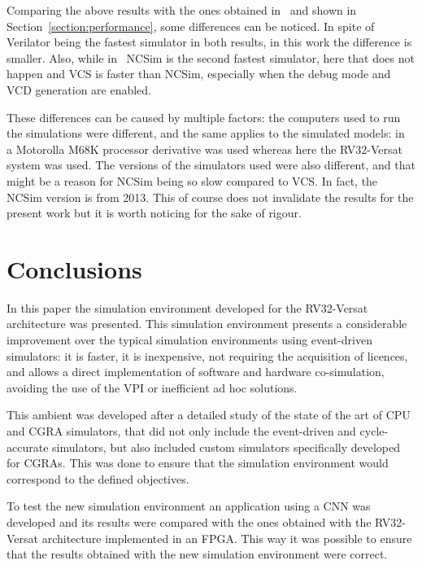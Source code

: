 \documentclass[conference]{IEEEtran}
\begin{document}
Comparing the above results with the ones obtained
in~\cite{verilator:benchmarks} and shown in Section~\ref{section:performance},
some differences can be noticed. In spite of Verilator being the fastest
simulator in both results, in this work the difference is smaller. Also, while
in~\cite{verilator:benchmarks} NCSim is the second fastest simulator, here that
does not happen and VCS is faster than NCSim, especially when the debug mode and
\ac{VCD} generation are enabled.

These differences can be caused by multiple factors: the computers used to run
the simulations were different, and the same applies to the simulated models:
in~\cite{verilator:benchmarks} a Motorolla M68K processor derivative was used
whereas here the RV32-Versat system was used. The versions of the simulators
used were also different, and that might be a reason for NCSim being
so slow compared to VCS. In fact, the NCSim version is from 2013. This of course
does not invalidate the results for the present work but it is worth noticing for
the sake of rigour.


\section{Conclusions}
\label{chapter:conclusions}

In this paper the simulation environment developed for the RV32-Versat architecture was 
presented. This simulation environment presents a considerable improvement over the 
typical simulation environments using event-driven simulators: it is faster, it is 
inexpensive, not requiring the acquisition of licences, and allows a direct 
implementation of software and hardware co-simulation, avoiding the use of the \ac{VPI} 
or inefficient ad hoc solutions.

This ambient was developed after a detailed study of the state of the art of 
\ac{CPU} and \ac{CGRA} simulators, that did not only include the event-driven and 
cycle-accurate simulators, but also included custom simulators specifically developed for 
CGRAs. This was done to ensure that the simulation environment would correspond to the 
defined objectives.

To test the new simulation environment an application using a \ac{CNN} was developed and 
its results were compared with the ones obtained with the RV32-Versat architecture 
implemented in an \ac{FPGA}. This way it was possible to ensure that the results obtained 
with the new simulation environment were correct.
\end{document}
